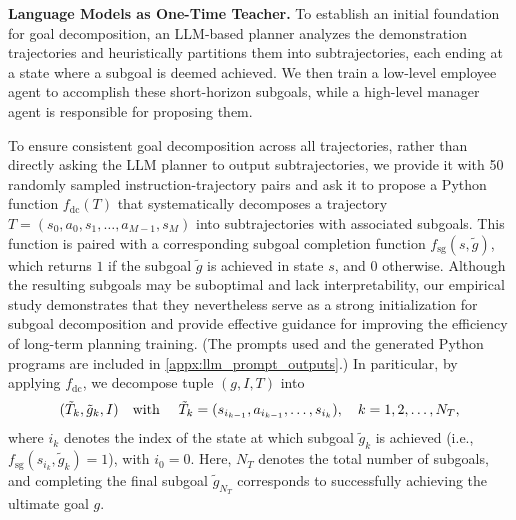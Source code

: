 
\textbf{Language Models as One-Time Teacher.} To establish an initial foundation for goal decomposition, an LLM-based planner analyzes the demonstration trajectories and heuristically partitions them into subtrajectories, each ending at a state where a subgoal is deemed achieved. We then train a low-level employee agent to accomplish these short-horizon subgoals, while a high-level manager agent is responsible for proposing them.


To ensure consistent goal decomposition across all trajectories, rather than directly asking the LLM planner to output subtrajectories, we provide it with 50 randomly sampled instruction-trajectory pairs and ask it to propose a Python function \( f_{\text{dc}}(T) \) that systematically decomposes a trajectory \( T  = (s_0, a_0, s_1, \ldots, a_{M-1}, s_M)\) into subtrajectories with associated subgoals. This function is paired with a corresponding subgoal completion function \( f_{\text{sg}}(s, \tilde g) \), which returns \( 1 \) if the subgoal \( \tilde g \) is achieved in state \( s \), and \( 0 \) otherwise. Although the resulting subgoals may be suboptimal and lack interpretability, our empirical study demonstrates that they nevertheless serve as a strong initialization for subgoal decomposition and provide effective guidance for improving the efficiency of long-term planning training. (The prompts used and the generated Python programs are included in \cref{appx:llm_prompt_outputs}.) In pariticular, by applying \( f_{\text{dc}} \), we decompose tuple $(g, I, T)$ into 
\begin{align}
	(\tilde T_k, \tilde g_k, I) \text{\quad with \quad} \tilde T_k = (s_{i_{k-1}}, a_{i_{k-1}}, \ldots, s_{i_{k}}), \quad k = 1, 2, \ldots, N_T, \label{eq:def_subtraj}
\end{align}
where \( i_k \) denotes the index of the state at which subgoal \( \tilde{g}_k \) is achieved (i.e., \( f_{\text{sg}}(s_{i_k}, \tilde{g}_k) = 1 \)), with \( i_0 = 0 \). Here, \(N_T\) denotes the total number of subgoals, and completing the final subgoal \(\tilde{g}_{N_T}\) corresponds to successfully achieving the ultimate goal \(g\).  

